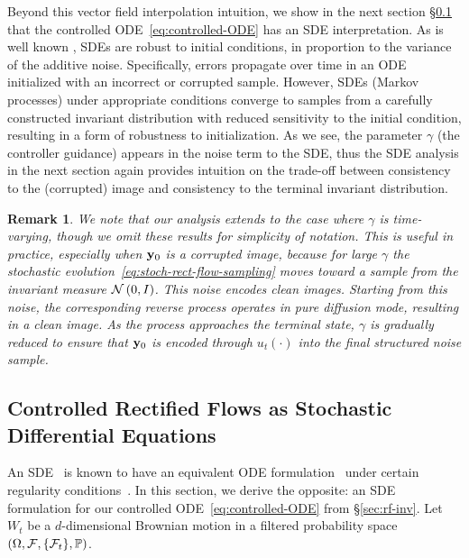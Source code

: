 \documentclass{article} %
\theoremstyle{plain}
\newtheorem{remark}[theorem]{Remark}
\begin{document}
Beyond this vector field interpolation intuition, we show in the next section \S\ref{sec:odes-vs-sdes} that the controlled ODE~\eqref{eq:controlled-ODE} has an SDE interpretation. As is well known \citep{ddpm,ddim,sdedit,songscore}, SDEs are robust to initial conditions, in proportion to the variance of the additive noise. Specifically, errors propagate over time in an ODE initialized with an incorrect or corrupted sample. However, SDEs (Markov processes) under appropriate conditions converge to samples from a carefully constructed invariant distribution with reduced sensitivity to the initial condition, resulting in a form of robustness to initialization. As we see, the parameter $\gamma$ (the controller guidance) appears in the noise term to the SDE, thus the SDE analysis in the next section again provides intuition on the trade-off between consistency to the (corrupted) image and consistency to the terminal invariant distribution.


\begin{remark}
\label{rmk:controlled-ode}
We note that our analysis extends to the case where $\gamma$ is time-varying, though we omit these results for simplicity of notation. 
This is useful in practice, especially when ${\mathbf{y}}_0$ is a corrupted image, because for large $\gamma$ the stochastic evolution~\eqref{eq:stoch-rect-flow-sampling} moves toward a sample from the invariant measure ${\mathcal{N}}\left(0,I \right)$.
This noise encodes clean images. 
Starting from this noise, the corresponding reverse process operates in pure diffusion mode, resulting in a clean image.
As the process approaches the terminal state, $\gamma$ is gradually reduced to ensure that ${\mathbf{y}}_0$ is encoded through $u_t(\cdot)$ into the final structured noise sample.
\end{remark}




\subsection{Controlled Rectified Flows as Stochastic Differential Equations}
\label{sec:odes-vs-sdes}
An SDE~\citep{ddpm} is known to have an equivalent ODE formulation~\citep{ddim} under certain regularity conditions~\citep{anderson,songscore}.
In this section, we derive the opposite: an SDE formulation for our controlled ODE~\eqref{eq:controlled-ODE}  from \S\ref{sec:rf-inv}. 
Let $W_t$ be a $d$-dimensional Brownian motion in a filtered probability space $(\Omega, {\mathcal{F}}, \{{\mathcal{F}}_t\}, \mathbb{P})$.
\end{document}
